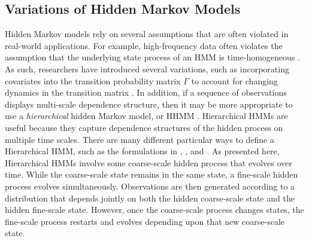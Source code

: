 \subsection{Variations of Hidden Markov Models}
\label{subsec:HHMM}

Hidden Markov models rely on several assumptions that are often violated in real-world applications. For example, high-frequency data often violates the assumption that the underlying state process of an HMM is time-homogeneous %
\citep{Sidrow:2021}. As such, researchers have introduced several variations, such as incorporating covariates into the transition probability matrix $\Gamma$ to account for changing dynamics in the transition matrix \citep{McClintock:2018}. In addition, if a sequence of observations displays multi-scale dependence structure, then it may be more appropriate to use a \textit{hierarchical} hidden Markov model, or HHMM \citep{Barajas:2017,Adam:2019,Sidrow:2021}. Hierarchical HMMs are useful because they capture dependence structures of the hidden process on multiple time scales. There are many different particular ways to define a Hierarchical HMM, such as the formulations in \citet{Barajas:2017}, \citet{Adam:2019}, and \citet{Sidrow:2021}. As presented here, Hierarchical HMMs involve some coarse-scale hidden process that evolves over time. While the coarse-scale state remains in the same state, a fine-scale hidden process evolves simultaneously. Observations are then generated according to a distribution that depends jointly on both the hidden coarse-scale state and the hidden fine-scale state. However, once the coarse-scale process changes states, the fine-scale process restarts and evolves depending upon that new coarse-scale state.

